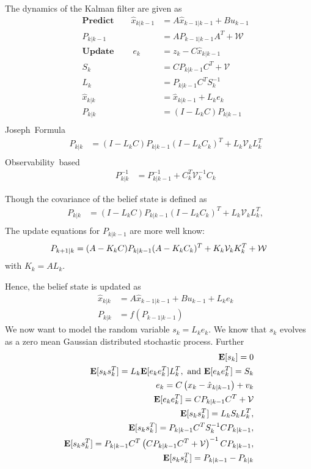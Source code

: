 \documentclass{ifacconf}
\begin{document}
The dynamics of the Kalman filter are given as
	\begin{align*}
	&&\textbf{Predict} \qquad \hat x_{k|k-1}&=A\hat x_{k-1|k-1}+Bu_{k-1}\\
	&&P_{k|k-1}&=AP_{k-1|k-1}A^T+\mathcal W
\\
	&&\textbf{Update} \  \qquad e_{k}&=z_k-C \hat x_{k|k-1}\\
	&&S_k&=CP_{k|k-1}C^T+\mathcal V\\
	&&L_{k}&=P_{k|k-1}C^TS_k^{-1}\\
	&&\hat x_{k|k}&=\hat x_{k|k-1}+L_ke_k\\
	&&P_{k|k}&=(I-L_kC)P_{k|k-1}\\
	\end{align*}
	\mbox{Joseph Formula  }
	\begin{align*}
	&&P_{k|k}&=(I-L_kC)P_{k|k-1}(I-L_kC_k)^T+L_k\mathcal V_kL_k^T\\
		\end{align*}
\mbox{Observability based }
	\begin{align*}
	&& P_{k|k}^{-1}&=P_{k|k-1}^{-1}+C_k^T \mathcal  V_k^{-1}C_k
	\end{align*}

Though the covariance of the belief state is defined as 
	\begin{align*}
	&&P_{k|k}&=(I-L_kC)P_{k|k-1}(I-L_kC_k)^T+L_k\mathcal V_kL_k^T, \\
		\end{align*}
		The update equations for $P_{k|k-1}$ are more well know:
			\begin{align*}
	&&P_{k+1|k}&=(A-K_kC)P_{k|k-1}(A-K_kC_k)^T+K_k\mathcal V_kK_k^T +\mathcal{W}
		\end{align*}
		with $K_k=AL_k$.
		
Hence, the belief state is updated as
\begin{align}
	&&\hat x_{k|k}&=A\hat x_{k-1|k-1}+Bu_{k-1}+L_ke_k\\
	&&P_{k|k}&=f(P_{k-1|k-1})
\end{align}
We now want to model the random variable $s_k=L_ke_k$. We know that $s_k$ evolves as a zero mean Gaussian distributed stochastic process.
Further 
\begin{align*}
	\mathbf{E} [s_k]=0\\
	\mathbf{E} [s_ks_k^T]=L_k	\mathbf{E} [e_ke_k^T]L_k^T, \mbox{ and } \mathbf{E} [e_ke_k^T]=S_k \\
	e_k = C\left(x_k- \hat x_{k|k-1}\right)+v_k\\
	\mathbf{E} [e_ke_k^T] = C P_{k|k-1} C^T + \mathcal{V}\\
		\mathbf{E} [s_ks_k^T]=L_k S_k L_k^T,\\
				\mathbf{E} [s_ks_k^T]= P_{k|k-1} C^T S_k^{-1} C P_{k|k-1},\\
								\mathbf{E} [s_ks_k^T]= P_{k|k-1} C^T \left(CP_{k|k-1}C^T+\mathcal V\right)^{-1} C P_{k|k-1},\notag\\
\mathbf{E} [s_ks_k^T]= P_{k|k-1}-P_{k|k}\notag
\end{align*}
\end{document}
